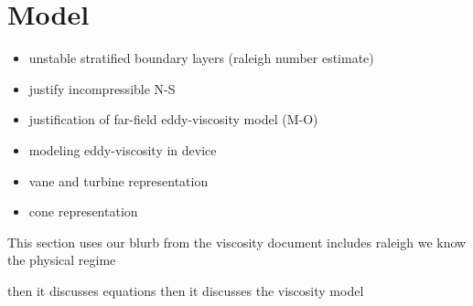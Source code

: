 \section{Model}

\begin{itemize}
\item unstable stratified boundary layers (raleigh number estimate)
\item justify incompressible N-S
\item justification of far-field eddy-viscosity model (M-O)
\item modeling eddy-viscosity in device 
\item vane and turbine representation
\item cone representation
\end{itemize}


This section uses our blurb from the viscosity document
includes raleigh 
we know the physical regime

then it discusses equations
then it discusses the viscosity model
